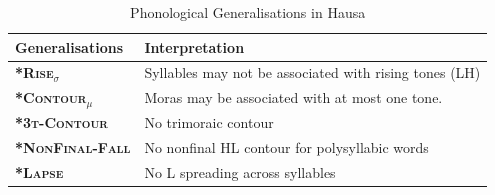 \documentclass{CUP-JNL-PHO}%
\theoremstyle{definition}
\numberwithin{equation}{section}
\theoremstyle{definition}
\begin{document}
\begin{table}
	\centering
	\begin{tabular}{ll}
		\toprule
		\textbf{Generalisations} & \textbf{Interpretation}                              \\
		\midrule
		\textbf{\textsc{*Rise$_\sigma$}}     & Syllables may not be associated with rising tones (LH) \\
		\textbf{\textsc{*Contour$_{\mu}$}}   & Moras may be associated with at most one tone.      \\
		\textbf{\textsc{*3t-Contour}}        & No trimoraic contour  \\
		\textbf{\textsc{*NonFinal-Fall}}     & No nonfinal HL contour for polysyllabic words         \\
		\textbf{\textsc{*Lapse}}             & No L spreading across syllables \\
		\bottomrule
	\end{tabular}
	\caption{Phonological Generalisations in Hausa}
	\label{rules}
\end{table}
\end{document}
